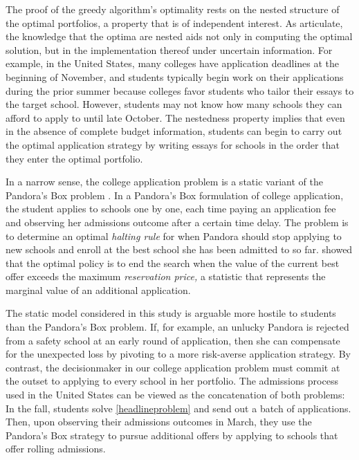 The proof of the greedy algorithm's optimality rests on the nested structure of the optimal portfolios, a property that is of independent interest. As \cite{rozanovandtamir2020} articulate, the knowledge that the optima are nested aids not only in computing the optimal solution, but in the implementation thereof under uncertain information. For example, in the United States, many colleges have application deadlines at the beginning of November, and students typically begin work on their applications during the prior summer because colleges favor students who tailor their essays to the target school. However, students may not know how many schools they can afford to apply to until late October. The nestedness property implies that even in the absence of complete budget information, students can begin to carry out the optimal application strategy by writing essays for schools in the order that they enter the optimal portfolio.

In a narrow sense, the college application problem is a static variant of the Pandora's Box problem \citep{weitzman1979,boodaghiansetal2022}. In a Pandora's Box formulation of college application, the student applies to schools one by one, each time paying an application fee and observing her admissions outcome after a certain time delay. The problem is to determine an optimal \emph{halting rule} for when Pandora should stop applying to new schools and enroll at the best school she has been admitted to so far. \cite{weitzman1979} showed that the optimal policy is to end the search when the value of the current best offer exceeds the maximum \emph{reservation price,} a statistic that represents the marginal value of an additional application.

The static model considered in this study is arguable more hostile to students than the Pandora's Box problem. If, for example, an unlucky Pandora is rejected from a safety school at an early round of application, then she can compensate for the unexpected loss by pivoting to a more risk-averse application strategy. By contrast, the decisionmaker in our college application problem must commit at the outset to applying to every school in her portfolio. The admissions process used in the United States can be viewed as the concatenation of both problems: In the fall, students solve \eqref{headlineproblem} and send out a batch of applications. Then, upon observing their admissions outcomes in March, they use the Pandora's Box strategy to pursue additional offers by applying to schools that offer rolling admissions.

